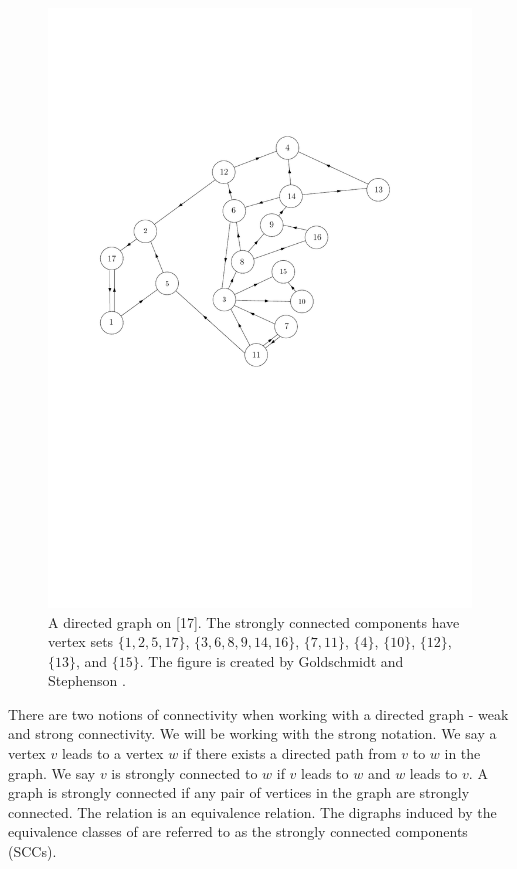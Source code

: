 \begin{figure}
    \centering
    \includegraphics[scale=0.6]{Content/Pictures/biggraph2.pdf}
    \caption{A directed graph on [17]. The strongly connected components have vertex sets $\{1,2,5,17\}$, $\{3,6,8,9,14,16\}$, $\{7,11\}$, $\{4\}$, $\{10\}$, $\{12\}$, $\{13\}$, and $\{15\}$. The figure is created by Goldschmidt and Stephenson \cite{goldschmidtScalingLimitCritical2019}.}
    \label{fig.SCCs}
\end{figure}

There are two notions of connectivity when working with a directed graph - weak and strong connectivity. We will be working with the strong notation. We say a vertex $v$ leads to a vertex $w$ if there exists a directed path from $v$ to $w$ in the graph. We say $v$ is strongly connected to $w$ if $v$ leads to $w$ and $w$ leads to $v$. A graph is strongly connected if any pair of vertices in the graph are strongly connected. The relation is an equivalence relation. The digraphs induced by the equivalence classes of are referred to as the strongly connected components (SCCs).

